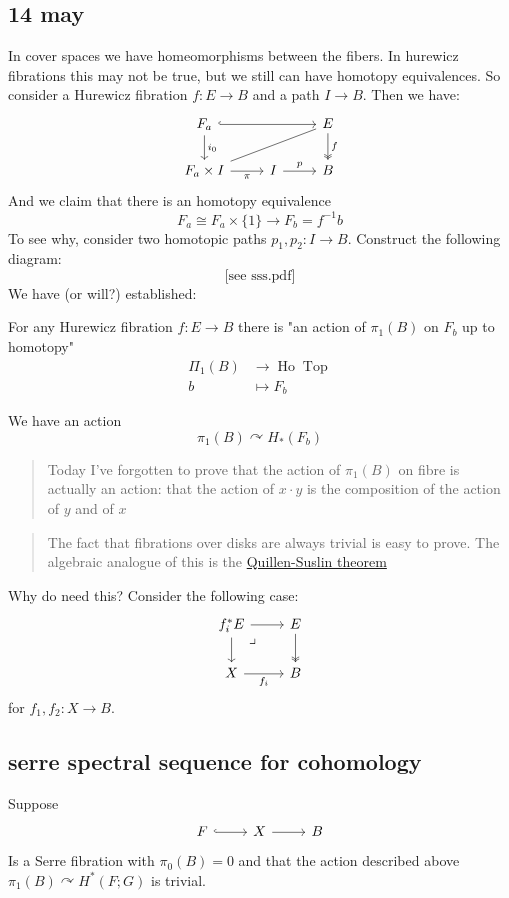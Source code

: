 \documentclass{article}
\DeclareMathOperator{\Ho}{Ho}
\DeclareMathOperator{\Top}{Top}
\begin{document}
\subsection{14 may}
In cover spaces we have homeomorphisms between the fibers. In hurewicz fibrations this may not be true, but we still can have homotopy equivalences. So consider a Hurewicz fibration $f:E\to B$ and a path $I\to B$. Then we have:
\[\begin{tikzcd}
	F_a\arrow[d,"i_0"]\arrow[rr,hook]&&E\arrow[d,two heads,"f"]\\
	F_a\times I\arrow[r,"\pi",swap]\arrow[urr,dash]&I\arrow[r,"p"]&B
\end{tikzcd}\]
And we claim that there is an homotopy equivalence
\[F_a\cong F_a\times\{1\}\to F_b=f^{-1}b\]
To see why, consider two homotopic paths $p_1,p_2:I\to B$. Construct the following diagram:
\[\text{[see sss.pdf]}\]
We have (or will?) established:
\begin{prop}
	For any Hurewicz fibration $f:E\to B$ there is "an action of $\pi_1(B)$ on $F_b$ up to homotopy"
	\begin{align*}
		\Pi_1(B)&\to \Ho\Top\\
		b&\mapsto F_b
	\end{align*}
\end{prop}
We have an action
\[\pi_1(B)\curvearrowright H_*(F_b)\]

\begin{quotation}
	Today I've forgotten to prove that the action of $\pi_1(B)$ on fibre is actually an action: that the action of $x\cdot y$ is the composition of the action of $y$ and of $x$
\end{quotation}
\begin{quotation}
	The fact that fibrations over disks are always trivial is easy to prove. The algebraic analogue of this is the \href{https://en.m.wikipedia.org/wiki/Quillen%E2%80%93Suslin_theorem}{Quillen-Suslin theorem}
\end{quotation}

Why do need this? Consider the following case:
\[\begin{tikzcd}
	f_i^*E\arrow[r]\arrow[dr,phantom,"\lrcorner",very near start]\arrow[d]&E\arrow[d,two heads]\\
	X\arrow[r,swap,"f_i"]&B
\end{tikzcd}\]
for $f_1,f_2:X\to B$.

\subsection{serre spectral sequence for cohomology}
Suppose
\[\begin{tikzcd}
	F\arrow[r,hook]&X\arrow[r]&B
\end{tikzcd}\]
Is a Serre fibration with $\pi_0(B)=0$ and that the action described above $\pi_1(B)\curvearrowright H^*(F;G)$ is trivial.
\end{document}
